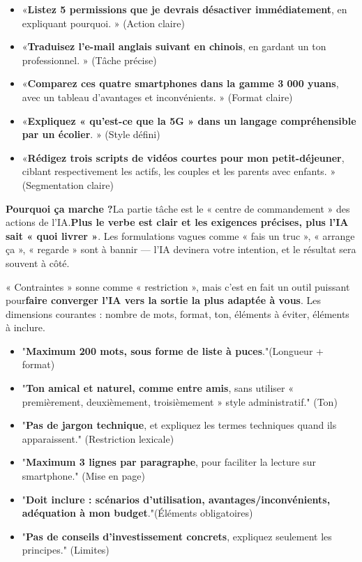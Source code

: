 
\begin{itemize}
  \item «\textbf{Listez 5 permissions que je devrais désactiver immédiatement}, en expliquant pourquoi. » (Action claire)
  \item «\textbf{Traduisez l’e-mail anglais suivant en chinois}, en gardant un ton professionnel. » (Tâche précise)
  \item «\textbf{Comparez ces quatre smartphones dans la gamme 3 000 yuans}, avec un tableau d’avantages et inconvénients. » (Format claire)
  \item «\textbf{Expliquez « qu’est-ce que la 5G » dans un langage compréhensible par un écolier}. » (Style défini)
  \item «\textbf{Rédigez trois scripts de vidéos courtes pour mon petit-déjeuner}, ciblant respectivement les actifs, les couples et les parents avec enfants. » (Segmentation claire)
\end{itemize}

\textbf{Pourquoi ça marche ?}La partie tâche est le « centre de commandement » des actions de l’IA.\textbf{Plus le verbe est clair et les exigences précises, plus l’IA sait « quoi livrer »}. Les formulations vagues comme « fais un truc », « arrange ça », « regarde » sont à bannir — l’IA devinera votre intention, et le résultat sera souvent à côté.


« Contraintes » sonne comme « restriction », mais c’est en fait un outil puissant pour\textbf{faire converger l’IA vers la sortie la plus adaptée à vous}. Les dimensions courantes : nombre de mots, format, ton, éléments à éviter, éléments à inclure.


\begin{itemize}
  \item "\textbf{Maximum 200 mots, sous forme de liste à puces}."(Longueur + format)
  \item "\textbf{Ton amical et naturel, comme entre amis}, sans utiliser « premièrement, deuxièmement, troisièmement » style administratif." (Ton)
  \item "\textbf{Pas de jargon technique}, et expliquez les termes techniques quand ils apparaissent." (Restriction lexicale)
  \item "\textbf{Maximum 3 lignes par paragraphe}, pour faciliter la lecture sur smartphone." (Mise en page)
  \item "\textbf{Doit inclure : scénarios d'utilisation, avantages/inconvénients, adéquation à mon budget}."(Éléments obligatoires)
  \item "\textbf{Pas de conseils d'investissement concrets}, expliquez seulement les principes." (Limites)
\end{itemize}

